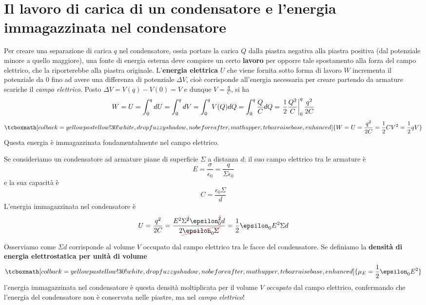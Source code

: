 \section{Il lavoro di carica di un condensatore e l'energia immagazzinata nel condensatore}
Per creare una separazione di carica $q$ nel condensatore, ossia portare la carica $Q$ dalla piastra negativa alla piastra positiva (dal potenziale minore a quello maggiore), una fonte di energia esterna deve compiere un certo \textbf{lavoro} per opporre tale spostamento alla forza del campo elettrico, che la riporterebbe alla piastra originale. L'\textbf{energia elettrica} $U$ che viene fornita sotto forma di lavoro $W$ incrementa il potenziale da $0$ fino ad avere una differenza di potenziale $\Delta V$, cioè corrisponde all'energia necessaria per creare partendo da armature scariche il \textit{campo elettrico}. Posto $\Delta V=V(q)-V(0)=V$ e dunque $V=\frac{q}{C}$, si ha
\begin{equation*}
	W=U=\int_{0}^{q}dU=\int_{0}^{q}dV=\int_0^{q}V(Q)dQ=\int_{0}^{q}\frac{Q}{C}dQ=\eval{\frac{1}{2}\frac{Q^2}{C}}_{0}^{q}\frac{q^2}{2C}
\end{equation*}
\begin{equation}
	\tcboxmath[colback=yellowpastellow!30!white,drop fuzzy shadow, nobeforeafter, math upper, tcbox raise base, enhanced]{W=U=\frac{q^2}{2C}=\frac{1}{2}CV^2=\frac{1}{2}qV}
\end{equation}
Questa energia è immagazzinata fondamentalmente nel campo elettrico.
\begin{examplewt}
	Se consideriamo un condensatore ad armature piane di superficie $\Sigma$ a distanza $d$; il suo campo elettrico tra le armature è
	\begin{equation*}
		E=\frac{\sigma}{\epsilon_0}=\frac{q}{\Sigma \epsilon_0}
	\end{equation*}
	e la sua capacità è
	\begin{equation*}
		C=\frac{\epsilon_0\Sigma}{d}
	\end{equation*}
	L'energia immagazzinata nel condensatore è
	\begin{equation*}
		U=\frac{q^2}{2C}=\frac{E^2\Sigma^{\Ccancel[red]{2}}\epsilon_0^{\Ccancel[red]{2}} d}{2\Ccancel[red]{\epsilon_0}\Ccancel[red]{\Sigma}}=\frac{1}{2}\epsilon_0E^2\Sigma d
	\end{equation*}
\end{examplewt} 
Osserviamo come $\Sigma d$ corrisponde al volume $V$ occupato dal campo elettrico tra le facce del condensatore. Se definiamo la \textbf{densità di energia elettrostatica per unità di volume}
\begin{equation}\label{DensitàEnergiaElettrostatica}
	\tcboxmath[colback=yellowpastellow!30!white,drop fuzzy shadow, nobeforeafter, math upper, tcbox raise base, enhanced]{\mu_{E}=\frac{1}{2}\epsilon_0E^2}
\end{equation}
l'energia immagazzinata nel condensatore è questa densità moltiplicata per il volume $V$ \textit{occupato} dal campo elettrico, confermando che l'energia del condensatore non è conservata nelle piastre, ma nel \textit{campo elettrico}!

